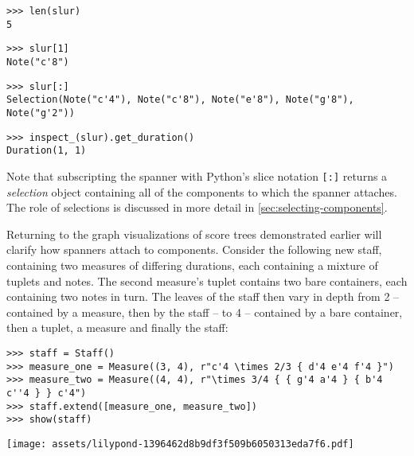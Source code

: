 \begin{comment}
<abjad>
len(slur)
slur[1]
slur[:]
inspect_(slur).get_duration()
</abjad>
\end{comment}

\begin{abjadbookoutput}
\begin{singlespacing}
\vspace{-0.5\baselineskip}
\begin{verbatim}
>>> len(slur)
5
\end{verbatim}
\begin{verbatim}
>>> slur[1]
Note("c'8")
\end{verbatim}
\begin{verbatim}
>>> slur[:]
Selection(Note("c'4"), Note("c'8"), Note("e'8"), Note("g'8"), Note("g'2"))
\end{verbatim}
\begin{verbatim}
>>> inspect_(slur).get_duration()
Duration(1, 1)
\end{verbatim}
\end{singlespacing}
\end{abjadbookoutput}

\noindent Note that subscripting the spanner with Python's slice notation
\texttt{[:]} returns a \emph{selection} object containing all of the components
to which the spanner attaches. The role of selections is discussed in more
detail in \autoref{sec:selecting-components}.

Returning to the graph visualizations of score trees demonstrated
earlier will clarify how spanners attach to components. Consider the following
new staff, containing two measures of differing durations, each containing a
mixture of tuplets and notes. The second measure's tuplet contains two bare
containers, each containing two notes in turn. The leaves of the staff then
vary in depth from 2 -- contained by a measure, then by the staff -- to 4 --
contained by a bare container, then a tuplet, a measure and finally the staff:

\begin{comment}
<abjad>
staff = Staff()
measure_one = Measure((3, 4), r"c'4 \times 2/3 { d'4 e'4 f'4 }")
measure_two = Measure((4, 4), r"\times 3/4 { { g'4 a'4 } { b'4 c''4 } } c'4")
staff.extend([measure_one, measure_two])
show(staff)
</abjad>
\end{comment}

\begin{abjadbookoutput}
\begin{singlespacing}
\vspace{-0.5\baselineskip}
\begin{verbatim}
>>> staff = Staff()
>>> measure_one = Measure((3, 4), r"c'4 \times 2/3 { d'4 e'4 f'4 }")
>>> measure_two = Measure((4, 4), r"\times 3/4 { { g'4 a'4 } { b'4 c''4 } } c'4")
>>> staff.extend([measure_one, measure_two])
>>> show(staff)
\end{verbatim}
\noindent\texttt{[image: assets/lilypond-1396462d8b9df3f509b6050313eda7f6.pdf]}
\end{singlespacing}
\end{abjadbookoutput}

